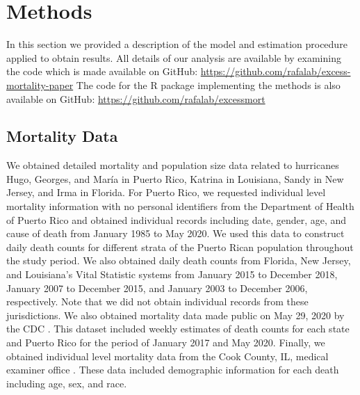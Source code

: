 \documentclass[11pt]{article}
\begin{document}
\section{Methods}
\label{sec:methods}

In this section we provided a description of the model and estimation procedure applied to obtain results. All details of our analysis are available by examining the code which is made available on GitHub: \url{https://github.com/rafalab/excess-mortality-paper}
The code for the R package implementing the methods is also available on GitHub: \url{https://github.com/rafalab/excessmort}

\subsection{Mortality Data}
\label{subsec:mortality-data}
We obtained detailed mortality and population size data related to hurricanes Hugo, Georges, and Mar\'ia in Puerto Rico, Katrina in Louisiana, Sandy in New Jersey, and Irma in Florida. For Puerto Rico, we requested individual level mortality information with no personal identifiers from the Department of Health of Puerto Rico and obtained individual records including date, gender, age, and cause of death from January 1985 to May 2020. We used this data to construct daily death counts for different strata of the Puerto Rican population throughout the study period. We also obtained daily death counts from Florida, New Jersey, and Louisiana’s Vital Statistic systems from January 2015 to December 2018, January 2007 to December 2015, and January 2003 to December 2006, respectively. Note that we did not obtain individual records from these jurisdictions. We also obtained mortality data made public on May 29, 2020 by the CDC  \cite{cdc2020covid19}. This dataset included weekly estimates of death counts for each state and Puerto Rico for the period of January 2017 and May 2020. 
Finally, we obtained individual level mortality data from the Cook County, IL, medical examiner office \cite{cookcovid19}. These data included demographic information for each death including age, sex, and race.
\end{document}

